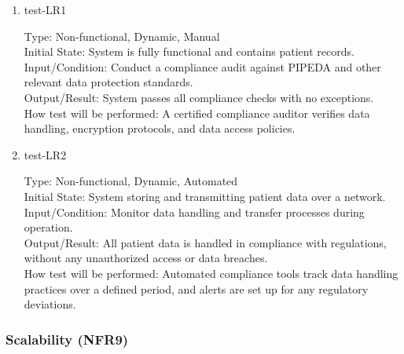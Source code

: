 \documentclass[12pt, titlepage]{article}
\begin{document}
\begin{enumerate}
    \item{test-LR1\\} \label{test-LR1}
    
    Type: Non-functional, Dynamic, Manual\\
    
    Initial State: System is fully functional and contains patient records.\\
    
    Input/Condition: Conduct a compliance audit against PIPEDA and other relevant data protection standards.\\
    
    Output/Result: System passes all compliance checks with no exceptions.\\
    
    How test will be performed: A certified compliance auditor verifies data handling, encryption protocols, and data access policies.

    \item{test-LR2\\} \label{test-LR2}
    
    Type: Non-functional, Dynamic, Automated\\
    
    Initial State: System storing and transmitting patient data over a network.\\
    
    Input/Condition: Monitor data handling and transfer processes during operation.\\
    
    Output/Result: All patient data is handled in compliance with regulations, without any unauthorized access or data breaches.\\
    
    How test will be performed: Automated compliance tools track data handling practices over a defined period, and alerts are set up for any regulatory deviations.
\end{enumerate}

\subsubsection{Scalability (NFR9)} \label{section:4.2.9}
\end{document}
